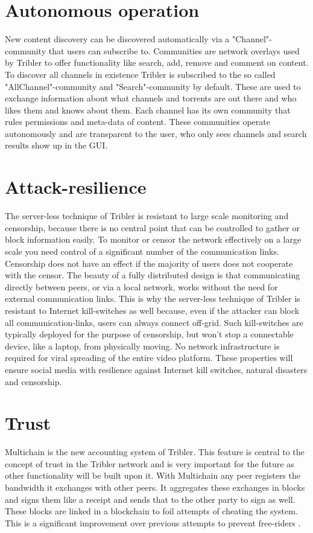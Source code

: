 \section{Autonomous operation}
New content discovery can be discovered automatically via a "Channel"-community that users can subscribe to.
Communities are network overlays used by Tribler to offer functionality like search, add, remove and comment on content.
To discover all channels in existence Tribler is subscribed to the so called "AllChannel"-community and "Search"-community by default.
These are used to exchange information about what channels and torrents are out there and who likes them and knows about them.
Each channel has its own community that rules permissions and meta-data of content.
These communities operate autonomously and are transparent to the user, who only sees channels and search results show up in the GUI.


\section{Attack-resilience}
The server-less technique of Tribler is resistant to large scale monitoring and censorship, because there is no central point that can be controlled to gather or block information easily.
To monitor or censor the network effectively on a large scale you need control of a significant number of the communication links.
Censorship does not have an effect if the majority of users does not cooperate with the censor.
The beauty of a fully distributed design is that communicating directly between peers, or via a local network, works without the need for external communication links.
This is why the server-less technique of Tribler is resistant to Internet kill-switches as well because, even if the attacker can block all communication-links, users can always connect off-grid.
Such kill-switches are typically deployed for the purpose of censorship, but won't stop a connectable device, like a laptop, from physically moving.
No network infrastructure is required for viral spreading of the entire video platform.
These properties will ensure social media with resilience against Internet kill switches, natural disasters and censorship.


\section{Trust}
Multichain is the new accounting system of Tribler.
This feature is central to the concept of trust in the Tribler network and is very important for the future as other functionality will be built upon it.
With Multichain any peer registers the bandwidth it exchanges with other peers.
It aggregates these exchanges in blocks and signs them like a receipt and sends that to the other party to sign as well.
These blocks are linked in a blockchain to foil attempts of cheating the system.
This is a significant improvement over previous attempts to prevent free-riders \cite{JanDavidFFFPaperIEEE2008,mol2008a,bartercast, multichain}.

